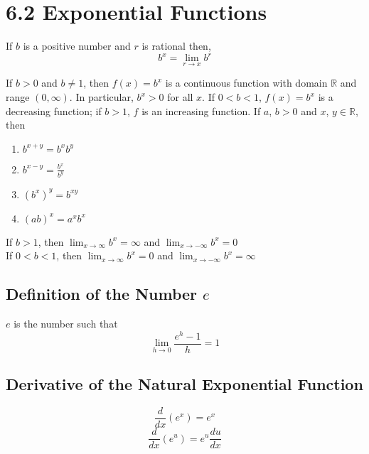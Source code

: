 %
%

\section*{6.2 Exponential Functions}

If \(b\) is a positive number and \(r\) is rational then,
\[ b^x= \lim_{r \to x}{b^r} \]

\begin{definition}
If \( b > 0 \) and \(b \neq 1 \), then \( f(x)=b^x \) is a continuous function with domain \( \mathbb{R} \) and range \( (0, \infty) \). In particular, \(b^x > 0\) for all \(x\). If \( 0 < b < 1 \), \(f(x) = b^x\) is a decreasing function; if \(b>1\), \(f\) is an increasing function. If \(a\), \(b > 0\) and \(x\), \(y \in \mathbb{R}\), then
\begin{enumerate}
\item \( b^{x+y}=b^x b^y \)
\item \( b^{x-y}=\frac{b^x}{b^y} \)
\item \( {(b^x)}^y=b^{xy} \)
\item \( {(ab)}^x = a^x b^x \)
\end{enumerate} 
\end{definition}

\noindent
If \(b>1\), then \( \lim_{x \to \infty}{b^x} = \infty \) and \( \lim_{x \to -\infty}{b^x}=0 \)
\\
If \( 0<b<1 \), then \( \lim_{x \to \infty}{b^x} = 0 \) and \( \lim_{x \to -\infty}{b^x} = \infty \)

\subsection*{Definition of the Number \( e \)}
\(e\) is the number such that \[ \lim_{h \to 0}{\frac{e^h -1}{h}} =1 \]

\subsection*{Derivative of the Natural Exponential Function}
\[ \frac{d}{dx}(e^x)=e^x \]
\[ \frac{d}{dx}(e^u)=e^u \frac{du}{dx} \]

\begin{center}
\end{center}

